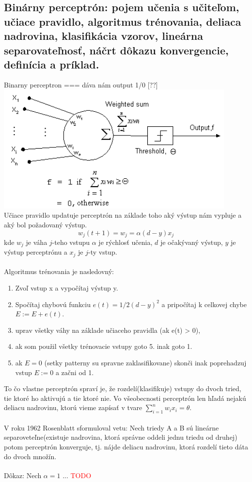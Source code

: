 \documentclass{article}
\numberwithin{equation}{section} %
\begin{document}
\subsection{Binárny perceptrón: pojem učenia s učiteľom, učiace pravidlo, algoritmus trénovania, deliaca nadrovina, klasifikácia vzorov, lineárna separovateľnosť, náčrt dôkazu konvergencie, definícia a príklad.}
Binarny perceptron === dáva nám output 1/0 [??]\\
\includegraphics[width=12cm]{imgs/threshold_neuron}\\
Učiace pravidlo updatuje perceptrón na základe toho aký výstup nám vypluje a aký bol požadovaný výstup. 
$$ w_j(t+1) = w_j = \alpha (d-y)x_j $$
kde $w_j$ je váha $j$-teho vstupu $\alpha$ je rýchlosť učenia, $d$ je očakývaný výstup, $y$ je výstup perceptrónu a $x_j$ je $j$-ty vstup.
\\\\
Algoritmus trénovania je nasledovný:
\begin{enumerate}
\item Zvoľ vstup x a vypočítaj výstup y.
\item Spočítaj chybovú funkciu $e(t) = 1/2(d-y)^2$ a pripočítaj k celkovej chybe $E := E + e(t)$.
\item uprav všetky váhy na základe učiaceho pravidla (ak e(t) > 0),
\item ak som použil všetky trénovacie vstupy goto 5. inak goto 1.
\item ak $E = 0$ (setky patterny su spravne zaklasifikovane) skonči inak poprehadzuj vstup $ E := 0 $ a začni od 1.
\end{enumerate}
To čo vlastne perceptrón spraví je, že rozdelí(klasifikuje) vstupy do dvoch tried, tie ktoré ho aktivujú a tie ktoré nie. Vo všeobecnosti perceptrón len hľadá nejakú deliacu nadrovinu, ktorú vieme zapísať v tvare $\sum_{i=1}^n w_ix_i = \theta$.
\\\\
V roku 1962 Rosenblatt sformuloval vetu: Nech triedy A a B sú lineárne separoveteľne(existuje nadrovina, ktorá správne oddeli jednu triedu od druhej) potom perceptrón konverguje, tj. nájde deliacu nadrovinu, ktorá rozdelí tieto dáta do dvoch množín.
\\\\
Dôkaz: Nech $\alpha = 1$ ... \textcolor{red}{TODO}
\end{document}
